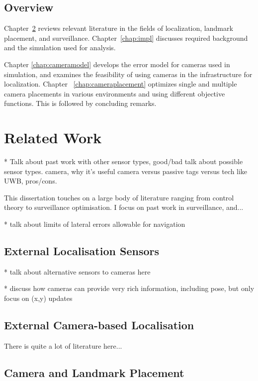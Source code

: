 \documentclass[a4paper,12pt,twoside,openright]{report}
\begin{document}
\section{Overview}

Chapter~\ref{chap:relatedwork} reviews relevant literature in the fields of
localization, landmark placement, and surveillance. Chapter~\ref{chap:impl} discusses required background and the simulation
used for analysis. 

Chapter \ref{chap:cameramodel} develops the error model for cameras
used in simulation, and examines the feasibility of using cameras in the infrastructure for localization.
Chapter ~\ref{chap:cameraplacement} optimizes single and multiple camera placements
in various environments and using different objective functions. This is followed by concluding remarks.

\chapter{Related Work} 
\label{chap:relatedwork}

* Talk about past work with other sensor types, good/bad
talk about possible sensor types. camera, why it's useful
camera versus passive tags versus tech like UWB, pros/cons.

This dissertation touches on a large body of literature ranging from 
control theory to surveillance optimisation. I focus on past work
in surveillance, and... 

* talk about limits of lateral errors allowable for navigation

\section{External Localisation Sensors}
* talk about alternative sensors to cameras here

* discuss how cameras can provide very rich information, including pose, but only focus on (x,y) updates

\section{External Camera-based Localisation}

There is quite a lot of literature here...

\section{Camera and Landmark Placement}
\end{document}
